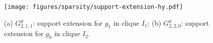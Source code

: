 
\begin{figure}[htbp]
    \centering
    \texttt{[image: figures/sparsity/support-extension-hy.pdf]}
    \caption{(a) $G_{2,1,1}^g$: support extension for $g_1$ in clique $I_1$; (b) $G_{2,2,0}^g$: support extension for $g_0$ in clique $I_2$. \label{fig:sp:support-extension}}
    \vspace{-3mm}
\end{figure}